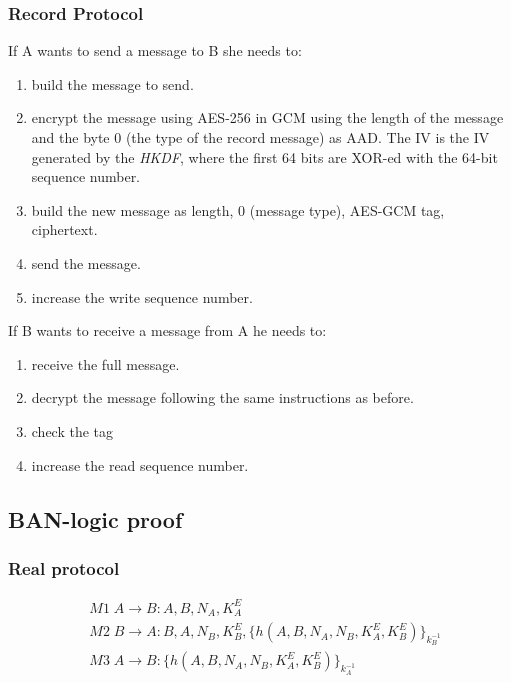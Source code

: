 \subsubsection{Record Protocol}
If A wants to send a message to B she needs to:
\begin{enumerate}
    \item build the message to send.
    \item encrypt the message using AES-256 in GCM using the length of the 
        message and the byte 0 (the type of the record message) as AAD. The IV
        is the IV generated by the \emph{HKDF}, where the first 64 bits are 
        XOR-ed with the 64-bit sequence number.
    \item build the new message as length, 0 (message type), AES-GCM tag, 
        ciphertext.
    \item send the message.
    \item increase the write sequence number.
\end{enumerate}

If B wants to receive a message from A he needs to:
\begin{enumerate}
    \item receive the full message.
    \item decrypt the message following the same instructions as before.
    \item check the tag
    \item increase the read sequence number.
\end{enumerate}

\subsection{BAN-logic proof}
\subsubsection{Real protocol}
\begin{align*}
    &M1 \; A \rightarrow B : A, B, N_A, K_A^E \\
    &M2 \; B \rightarrow A : B, A, N_B, K_B^E, \{h(A,B,N_A,N_B,K_A^E,K_B^E)\}_{k_B^{-1}} \\
    &M3 \; A \rightarrow B : \{h(A,B,N_A,N_B,K_A^E,K_B^E)\}_{k_A^{-1}}
\end{align*}

